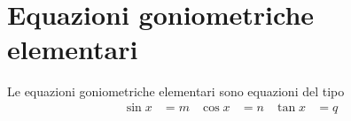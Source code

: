 %
\section{Equazioni goniometriche elementari}
\label{sec:EquazioniGoniometricheElementari}
Le equazioni goniometriche elementari sono equazioni del tipo
\begin{align*}
	\sin x&=m&\cos x&=n&\tan x&=q
\end{align*}
